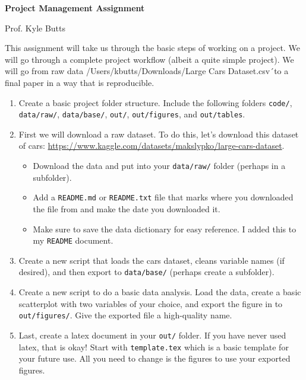 \documentclass[12pt]{article}
\begin{document}
\begin{center}
  {\Huge\bf Project Management Assignment}

  \medskip
  {\large Prof. Kyle Butts}
\end{center}

This assignment will take us through the basic steps of working on a project.
We will go through a complete project workflow (albeit a quite simple project).
We will go from raw data /Users/kbutts/Downloads/Large Cars Dataset.csv´to a final paper in a way that is reproducible.

\bigskip
\begin{enumerate}
  \item Create a basic project folder structure. Include the following folders \texttt{code/}, \texttt{data/raw/}, \texttt{data/base/}, \texttt{out/}, \texttt{out/figures}, and \texttt{out/tables}.
  
  \bigskip
  \item First we will download a raw dataset. To do this, let's download this dataset of cars: \url{https://www.kaggle.com/datasets/makslypko/large-cars-dataset}.
  \begin{itemize}
    \item Download the data and put into your \texttt{data/raw/} folder (perhaps in a subfolder).
    
    \item Add a \texttt{README.md} or \texttt{README.txt} file that marks where you downloaded the file from and make the date you downloaded it. 
    
    \item Make sure to save the data dictionary for easy reference. I added this to my \texttt{README} document.
  \end{itemize}

  \bigskip
  \item Create a new script that loads the cars dataset, cleans variable names (if desired), and then export to \texttt{data/base/} (perhaps create a subfolder).
  
  \bigskip
  \item Create a new script to do a basic data analysis. Load the data, create a basic scatterplot with two variables of your choice, and export the figure in to \texttt{out/figures/}. Give the exported file a high-quality name. 
  
  \bigskip
  \item Last, create a latex document in your \texttt{out/} folder. If you have never used latex, that is okay! Start with \texttt{template.tex} which is a basic template for your future use. All you need to change is the figures to use your exported figures.
\end{enumerate}
\end{document}
